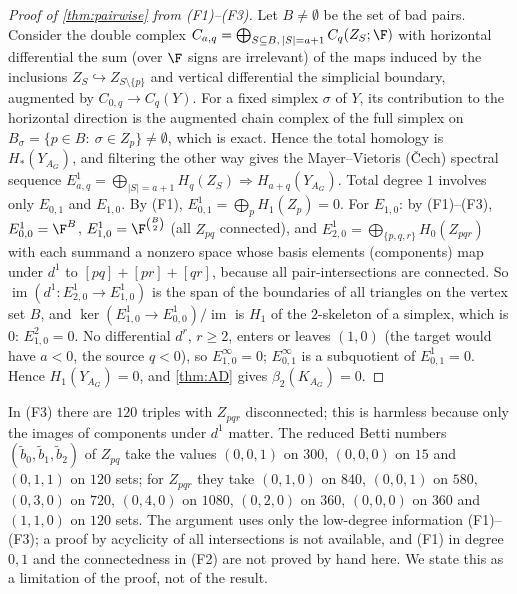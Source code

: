 \begin{proof}[Proof of \cref{thm:pairwise} from (F1)--(F3)]
Let $B\neq\emptyset$ be the set of bad pairs. Consider the double complex $C_{a,q}=\bigoplus_{S\subseteq B,\,|S|=a+1}C_q(Z_S;\F)$ with horizontal differential the sum (over $\F$ signs are irrelevant) of the maps induced by the inclusions $Z_S\hookrightarrow Z_{S\setminus\{p\}}$ and vertical differential the simplicial boundary, augmented by $C_{0,q}\to C_q(Y)$. For a fixed simplex $\sigma$ of $Y$, its contribution to the horizontal direction is the augmented chain complex of the full simplex on $B_\sigma=\{p\in B:\ \sigma\in Z_p\}\neq\emptyset$, which is exact. Hence the total homology is $H_*(Y_{A_G})$, and filtering the other way gives the Mayer--Vietoris (\v Cech) spectral sequence $E^1_{a,q}=\bigoplus_{|S|=a+1}H_q(Z_S)\Rightarrow H_{a+q}(Y_{A_G})$.
Total degree $1$ involves only $E_{0,1}$ and $E_{1,0}$. By (F1), $E^1_{0,1}=\bigoplus_pH_1(Z_p)=0$. For $E_{1,0}$: by (F1)--(F3), $E^1_{0,0}=\F^B$, $E^1_{1,0}=\F^{\binom B2}$ (all $Z_{pq}$ connected), and $E^1_{2,0}=\bigoplus_{\{p,q,r\}}H_0(Z_{pqr})$ with each summand a nonzero space whose basis elements (components) map under $d^1$ to $[pq]+[pr]+[qr]$, because all pair-intersections are connected. So $\operatorname{im}(d^1:E^1_{2,0}\to E^1_{1,0})$ is the span of the boundaries of all triangles on the vertex set $B$, and $\ker(E^1_{1,0}\to E^1_{0,0})/\operatorname{im}$ is $H_1$ of the $2$-skeleton of a simplex, which is $0$: $E^2_{1,0}=0$. No differential $d^r$, $r\ge2$, enters or leaves $(1,0)$ (the target would have $a<0$, the source $q<0$), so $E^\infty_{1,0}=0$; $E^\infty_{0,1}$ is a subquotient of $E^1_{0,1}=0$. Hence $H_1(Y_{A_G})=0$, and \cref{thm:AD} gives $\beta_2(K_{A_G})=0$.
\end{proof}
\begin{remark}
In (F3) there are $120$ triples with $Z_{pqr}$ disconnected; this is harmless because only the images of components under $d^1$ matter. The reduced Betti numbers $(\tilde b_0,\tilde b_1,\tilde b_2)$ of $Z_{pq}$ take the values $(0,0,1)$ on $300$, $(0,0,0)$ on $15$ and $(0,1,1)$ on $120$ sets; for $Z_{pqr}$ they take $(0,1,0)$ on $840$, $(0,0,1)$ on $580$, $(0,3,0)$ on $720$, $(0,4,0)$ on $1080$, $(0,2,0)$ on $360$, $(0,0,0)$ on $360$ and $(1,1,0)$ on $120$ sets. The argument uses only the low-degree information (F1)--(F3); a proof by acyclicity of all intersections is not available, and (F1) in degree $0,1$ and the connectedness in (F2) are not proved by hand here. We state this as a limitation of the proof, not of the result.
\end{remark}
